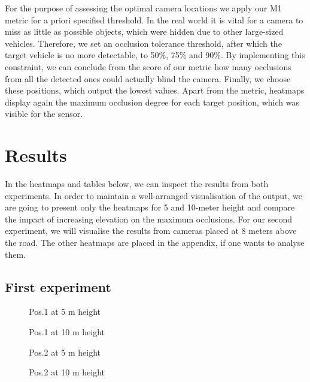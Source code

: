 For the purpose of assessing the optimal camera locations we apply our M1 metric for a priori specified threshold. In the real world it is vital for a camera to miss as little as possible objects, which were hidden due to other large-sized vehicles. Therefore, we set an occlusion tolerance threshold, after which the target vehicle is no more detectable, to 50\%, 75\% and 90\%. By implementing this constraint, we can conclude from the score of our metric how many occlusions from all the detected ones could actually blind the camera. Finally, we choose these positions, which output the lowest values. Apart from the metric, heatmaps display again the maximum occlusion degree for each target position, which was visible for the sensor.


\section{Results}\label{results}
In the heatmaps and tables below, we can inspect the results from both experiments. In order to maintain a well-arranged visualisation of the output, we are going to present only the heatmaps for 5 and 10-meter height and compare the impact of increasing elevation on the maximum occlusions. For our second experiment, we will visualise the results from cameras placed at 8 meters above the road. The other heatmaps are placed in the appendix, if one wants to analyse them.

\subsection{First experiment}

\begin{figure}[!htb]
  
  \caption{Pos.1 at 5 m height}\label{fig:pos1_5m}
\endminipage\hfill
{}
  
  \caption{Pos.1 at 10 m height}\label{fig:pos1_10m}
\endminipage\hfill
\end{figure}

\begin{figure}[!htb]
  
  \caption{Pos.2 at 5 m height}\label{fig:pos2_5m}
\endminipage\hfill
{}
  
  \caption{Pos.2 at 10 m height}\label{fig:pos2_10m}
\endminipage\hfill
\end{figure}

